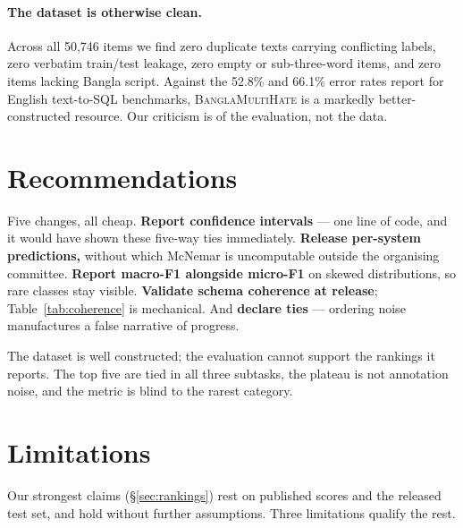 \documentclass[11pt]{article}
\begin{document}
\paragraph{The dataset is otherwise clean.} Across all 50{,}746 items we find
zero duplicate texts carrying conflicting labels, zero verbatim train/test
leakage, zero empty or sub-three-word items, and zero items lacking Bangla
script. Against the 52.8\% and 66.1\% error rates \citet{jin2026broken} report
for English text-to-SQL benchmarks, \textsc{BanglaMultiHate} is a markedly
better-constructed resource. Our criticism is of the evaluation, not the data.

\section{Recommendations}
\label{sec:disc}

Five changes, all cheap. \textbf{Report confidence intervals} --- one line of
code, and it would have shown these five-way ties immediately. \textbf{Release
per-system predictions,} without which McNemar is uncomputable outside the
organising committee. \textbf{Report macro-F1 alongside micro-F1} on skewed
distributions, so rare classes stay visible. \textbf{Validate schema coherence at
release}; Table~\ref{tab:coherence} is mechanical. And \textbf{declare ties} ---
ordering noise manufactures a false narrative of progress.

The dataset is well constructed; the evaluation cannot support the rankings it
reports. The top five are tied in all three subtasks, the plateau is not
annotation noise, and the metric is blind to the rarest category.

\section*{Limitations}
\label{sec:limitations}

Our strongest claims (\S\ref{sec:rankings}) rest on published scores and the
released test set, and hold without further assumptions. Three limitations
qualify the rest.
\end{document}

